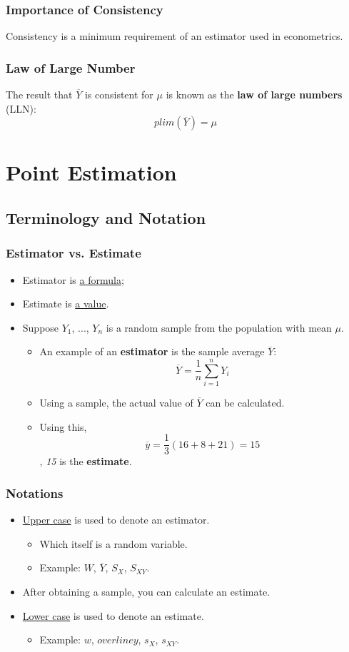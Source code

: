 \documentclass[11pt,a4paper]{report}
\begin{document}
\subsection{Importance of Consistency}
Consistency is a minimum requirement of an estimator used in econometrics.
\subsection{Law of Large Number}
The result that $\overline{Y}$ is consistent for $\mu$  is known as the \textbf{law of large numbers} (LLN):
\[plim(\overline{Y}) = \mu\]

\chapter{Point Estimation}
\section{Terminology and Notation}
\subsection{Estimator vs. Estimate}
\begin{itemize}
    \item Estimator is \underline{a formula};
    \item Estimate is \underline{a value}.
    \item Suppose {$Y_1$, ..., $Y_n$} is a random sample from the population with mean $\mu$.
    \begin{itemize}
        \item An example of an \textbf{estimator} is the sample average $\overline{Y}$:
        \[ \overline{Y} = \frac{1}{n} \displaystyle\sum_{i=1}^{n} Y_i \]
        \item Using a sample, the actual value of $\overline{Y}$ can be calculated.
        \item Using this, \[\overline{y} = \frac{1}{3}(16 + 8 + 21) = 15\], \textit{15} is the \textbf{estimate}.
    \end{itemize}
\end{itemize}
\subsection{Notations}
\begin{itemize}
    \item \underline{Upper case} is used to denote an estimator.
    \begin{itemize}
        \item Which itself is a random variable.
        \item Example: $W$, $\overline{Y}$, $S_X$, $S_{XY}$. 
    \end{itemize}
    \item After obtaining a sample, you can calculate an estimate.
    \item \underline{Lower case} is used to denote an estimate.
    \begin{itemize}
        \item Example: $w$, $overline{y}$, $s_X$, $s_{XY}$.
    \end{itemize}
\end{itemize}
\end{document}
